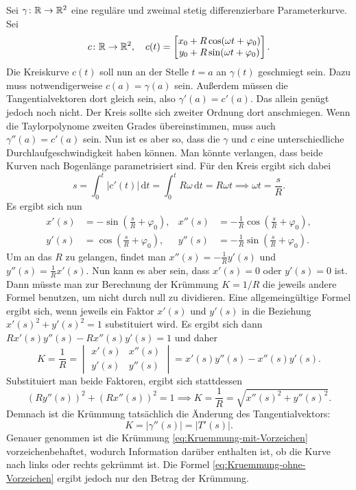 Sei $\gamma\colon\mathbb R\to\mathbb R^2$ eine reguläre und zweimal stetig
differenzierbare Parameterkurve. Sei
\begin{equation}
c\colon\mathbb R\to\mathbb R^2,\quad c(t)=\begin{bmatrix}
x_0+R\cos(\omega t+\varphi_0)\\
y_0+R\sin(\omega t+\varphi_0)
\end{bmatrix}.
\end{equation}
Die Kreiskurve $c(t)$ soll nun an der Stelle $t=a$ an $\gamma(t)$
geschmiegt sein. Dazu muss notwendigerweise $c(a)=\gamma(a)$ sein.
Außerdem müssen die Tangentialvektoren dort gleich sein, also
$\gamma'(a) = c'(a)$. Das allein genügt jedoch noch nicht. Der
Kreis sollte sich zweiter Ordnung dort anschmiegen. Wenn die
Taylorpolynome zweiten Grades übereinstimmen, muss auch
$\gamma''(a) = c'(a)$ sein. Nun ist es aber so, dass die $\gamma$
und $c$ eine unterschiedliche Durchlaufgeschwindigkeit haben können.
Man könnte verlangen, dass beide Kurven nach Bogenlänge parametrisiert
sind. Für den Kreis ergibt sich dabei
\begin{equation}
s = \int_0^t |c'(t)|\,\mathrm dt = \int_0^t R\omega\,\mathrm dt
= R\omega t \implies \omega t = \frac{s}{R}.
\end{equation}
Es ergibt sich nun
\begin{align}
x'(s) &= -\sin(\tfrac{s}{R}+\varphi_0),
& x''(s) &= -\tfrac{1}{R}\cos(\tfrac{s}{R}+\varphi_0),\\
y'(s) &= \cos(\tfrac{s}{R}+\varphi_0),
& y''(s) &= -\tfrac{1}{R}\sin(\tfrac{s}{R}+\varphi_0).
\end{align}
Um an das $R$ zu gelangen, findet man $x''(s)=-\tfrac{1}{R}y'(s)$
und $y''(s)=\tfrac{1}{R}x'(s)$. Nun kann es aber sein, dass
$x'(s)=0$ oder $y'(s)=0$ ist. Dann müsste man zur Berechnung der
Krümmung $K = 1/R$ die jeweils andere Formel benutzen, um
nicht durch null zu dividieren. Eine allgemeingültige Formel
ergibt sich, wenn jeweils ein Faktor $x'(s)$ und $y'(s)$ in
die Beziehung $x'(s)^2+y'(s)^2=1$ substituiert wird. Es ergibt
sich dann $Rx'(s)y''(s)-Rx''(s)y'(s)=1$ und daher
\begin{equation}\label{eq:Kruemmung-mit-Vorzeichen}
K = \frac{1}{R} =
\begin{vmatrix}
x'(s) & x''(s)\\
y'(s) & y''(s)
\end{vmatrix}
= x'(s)y''(s)-x''(s)y'(s).
\end{equation}
Substituiert man beide Faktoren, ergibt sich stattdessen
\begin{equation}
(Ry''(s))^2+(Rx''(s))^2 = 1
\implies K = \frac{1}{R} = \sqrt{x''(s)^2+y''(s)^2}.
\end{equation}
Demnach ist die Krümmung tatsächlich die Änderung des
Tangentialvektors:
\begin{equation}\label{eq:Kruemmung-ohne-Vorzeichen}
K = |\gamma''(s)| = |T'(s)|.
\end{equation}
Genauer genommen ist die Krümmung \eqref{eq:Kruemmung-mit-Vorzeichen}
vorzeichenbehaftet, wodurch Information darüber enthalten ist, ob
die Kurve nach links oder rechts gekrümmt ist. Die Formel
\eqref{eq:Kruemmung-ohne-Vorzeichen} ergibt jedoch nur den Betrag
der Krümmung.

